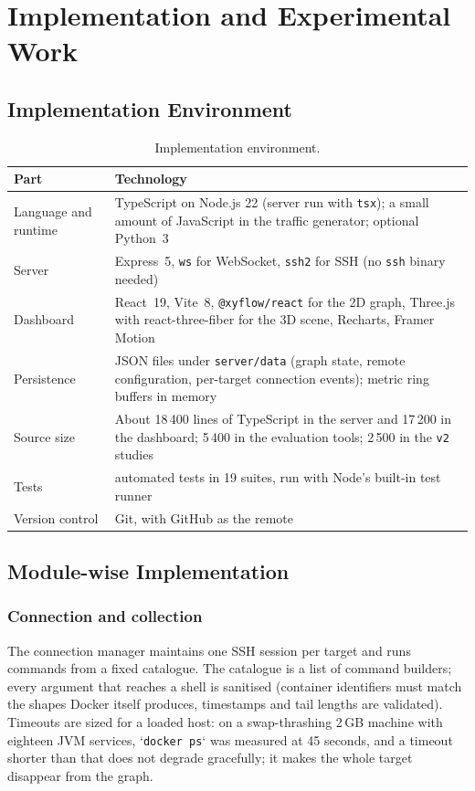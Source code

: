 \clearpage
\chapter[IMPLEMENTATION AND EXPERIMENTAL WORK]{Implementation and Experimental Work}
\label{ch:impl}

\section{Implementation Environment}
\begin{table}[!htbp]
\centering
\caption{Implementation environment.}
\label{tab:env}
\small
\renewcommand{\arraystretch}{1.2}
\begin{tabularx}{\textwidth}{>{\raggedright\arraybackslash}p{4.2cm}>{\raggedright\arraybackslash}X}
\toprule
\textbf{Part} & \textbf{Technology}\\
\midrule
Language and runtime & TypeScript on Node.js 22 (server run with \texttt{tsx}); a small amount of JavaScript in the traffic generator; optional Python~3\\
Server & Express~5, \texttt{ws} for WebSocket, \texttt{ssh2} for SSH (no \texttt{ssh} binary needed)\\
Dashboard & React~19, Vite~8, \texttt{@xyflow/react} for the 2D graph, Three.js with react-three-fiber for the 3D scene, Recharts, Framer Motion\\
Persistence & JSON files under \texttt{server/data} (graph state, remote configuration, per-target connection events); metric ring buffers in memory\\
Source size & About 18\,400 lines of TypeScript in the server and 17\,200 in the dashboard; 5\,400 in the evaluation tools; 2\,500 in the \texttt{v2} studies\\
Tests & 339 automated tests in 19 suites, run with Node's built-in test runner\\
Version control & Git, with GitHub as the remote\\
\bottomrule
\end{tabularx}
\end{table}

\section{Module-wise Implementation}

\subsection{Connection and collection}
The connection manager maintains one SSH session per target and runs commands from a fixed catalogue. The catalogue is a list of command builders; every argument that reaches a shell is sanitised (container identifiers must match the shapes Docker itself produces, timestamps and tail lengths are validated). Timeouts are sized for a loaded host: on a swap-thrashing 2\,GB machine with eighteen JVM services, `\texttt{docker ps}` was measured at 45 seconds, and a timeout shorter than that does not degrade gracefully; it makes the whole target disappear from the graph.

